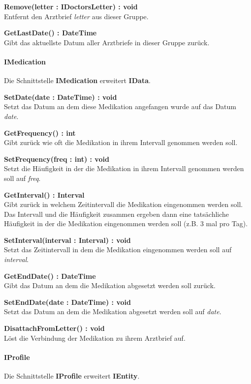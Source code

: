 \documentclass[a4paper]{scrreprt}
\begin{document}
\textbf{Remove(letter : IDoctorsLetter) : void}\\
Entfernt den Arztbrief \textit{letter} aus dieser Gruppe.

\textbf{GetLastDate() : DateTime}\\
Gibt das aktuellste Datum aller Arztbriefe in dieser Gruppe zurück.

\paragraph{IMedication}
Die Schnittstelle \textbf{IMedication} erweitert \textbf{IData}.

\textbf{SetDate(date : DateTime) : void}\\
Setzt das Datum an dem diese Medikation angefangen wurde auf das Datum \textit{date}.

\textbf{GetFrequency() : int}\\
Gibt zurück wie oft die Medikation in ihrem Intervall genommen werden soll.

\textbf{SetFrequency(freq : int) : void}\\
Setzt die Häufigkeit in der die Medikation in ihrem Intervall genommen werden soll auf \textit{freq}.

\textbf{GetInterval() : Interval}\\
Gibt zurück in welchem Zeitintervall die Medikation eingenommen werden soll. Das Intervall und die Häufigkeit zusammen ergeben dann eine tatsächliche Häufigkeit in der die Medikation eingenommen werden soll (z.B. 3 mal pro Tag).

\textbf{SetInterval(interval : Interval) : void}\\
Setzt das Zeitintervall in dem die Medikation eingenommen werden soll auf \textit{interval}.

\textbf{GetEndDate() : DateTime}\\
Gibt das Datum an dem die Medikation abgesetzt werden soll zurück.

\textbf{SetEndDate(date : DateTime) : void}\\
Setzt das Datum an dem die Medikation abgesetzt werden soll auf \textit{date}.

\textbf{DisattachFromLetter() : void}\\
Löst die Verbindung der Medikation zu ihrem Arztbrief auf.

\paragraph{IProfile}
Die Schnittstelle \textbf{IProfile} erweitert \textbf{IEntity}.
\end{document}
